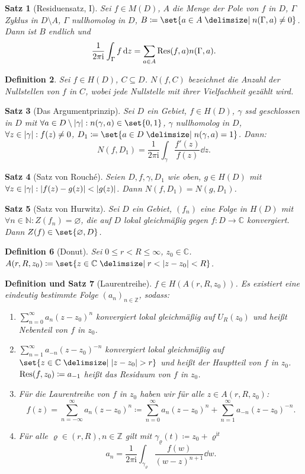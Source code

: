 \documentclass[a4paper]{article}
\newcounter{Sec}
\theoremstyle{marginbreak}
\newtheorem{definition}{Definition}[Sec]
\newtheorem{satz}[definition]{Satz}
\newtheorem{defsatz}[definition]{Definition und Satz}
\newcommand{\C}{\mathbb{C}}
\renewcommand{\i}{\mathrm{i}}
\begin{document}
	\begin{satz}[Residuensatz, I]
		Sei $f\in M(D)$, $A$ die Menge der Pole von $f$ in $D$, $\Gamma$ Zyklus in $D\setminus A$,
		$\Gamma$ nullhomolog in $D$, $B\coloneqq\set{a\in A\given n(\Gamma, a)\neq 0}$. Dann ist $B$ endlich
		und
		\[
			\frac{1}{2\pi\i}\int_\Gamma f\dd{z}=\sum_{a\in A}\Res(f, a)n(\Gamma, a).
		\]
	\end{satz}
	\begin{definition}
		Sei $f\in H(D)$, $C\subseteq D$. $N(f, C)$ bezeichnet die Anzahl der Nullstellen
		von $f$ in $C$, wobei jede Nullstelle mit ihrer Vielfachheit gezählt wird.
	\end{definition}
	\begin{satz}[Das Argumentprinzip]
		Sei $D$ ein Gebiet, $f\in H(D)$, $\gamma$ ssd geschlossen in $D$ mit $\forall a\in D\setminus\abs{\gamma}: n(\gamma, a)\in\set{0, 1}$,
		$\gamma$ nullhomolog in $D$, $\forall z\in\abs{\gamma}:f(z)\neq 0$, $D_1\coloneqq\set{a\in D\given n(\gamma, a)=1}$. Dann:
		\[
			N(f, D_1)=\frac{1}{2\pi\i}\int_\gamma\frac{f'(z)}{f(z)}\dd{z}.
		\]
	\end{satz}
	\begin{satz}[Satz von Rouché]
		Seien $D, f, \gamma, D_1$ wie oben, $g\in H(D)$ mit $\forall z\in\abs{\gamma}: \abs{f(z)-g(z)}<\abs{g(z)}$.
		Dann $N(f, D_1)=N(g, D_1)$.
	\end{satz}
	\begin{satz}[Satz von Hurwitz]
		Sei $D$ ein Gebiet, $(f_n)$ eine Folge in $H(D)$ mit $\forall n\in\mathbb{N}:Z(f_n)=\varnothing$,
		die auf $D$ lokal gleichmäßig gegen $f\colon D\to\C$ konvergiert. Dann $Z(f)\in\set{\varnothing, D}$.
	\end{satz}
	\begin{definition}[Donut]
		Sei $0\leq r<R\leq \infty$, $z_0\in\C$. $A(r, R, z_0)\coloneqq\set{z\in\C\given r<\abs{z-z_0}<R}$.
	\end{definition}
	\begin{defsatz}[Laurentreihe]
		$f\in H(A(r, R, z_0))$. Es existiert eine eindeutig bestimmte Folge $(a_n)_{n\in\mathbb{Z}}$, sodass:
		\begin{enumerate}[label=(\alph*)]
			\item $\sum_{n=0}^\infty a_n(z-z_0)^n$ konvergiert lokal gleichmäßig auf $U_R(z_0)$ und heißt
				Nebenteil von $f$ in $z_0$.
			\item $\sum_{n=1}^\infty a_{-n}(z-z_0)^{-n}$ konvergiert lokal gleichmäßig auf $\set{z\in\C\given\abs{z-z_0}>r}$
				und heißt der Hauptteil von $f$ in $z_0$. $\Res(f, z_0)\coloneqq a_{-1}$ heißt das Residuum von $f$ in $z_0$.
			\item Für die Laurentreihe von $f$ in $z_0$ haben wir für alle $z\in A(r, R, z_0)$:
				\[
					f(z)=\sum_{n=-\infty}^\infty a_n(z-z_0)^n\coloneqq \sum_{n=0}^\infty a_n(z-z_0)^n+\sum_{n=1}^\infty a_{-n}(z-z_0)^{-n}.
				\]
			\item Für alle $\varrho\in(r, R), n\in\mathbb{Z}$ gilt mit $\gamma_\varrho(t)\coloneqq z_0+\varrho^{\i t}$
				\[
					a_n=\frac{1}{2\pi\i}\int_{\gamma_\varrho}\frac{f(w)}{(w-z)^{n+1}}\dd{w}.
				\]
		\end{enumerate}
	\end{defsatz}
\end{document}
